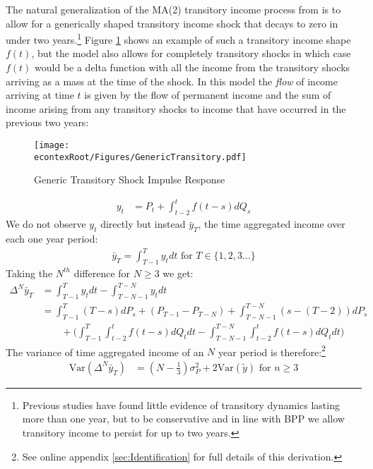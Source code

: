 \documentclass[titlepage]{\econtex}\newcommand{\texname}{ConsumptionHeterogeneity}
\begin{document}
The natural generalization of the MA(2) transitory income process from \cite{carroll_nature_1997} is to allow for a generically shaped transitory income shock that decays to zero in under two years.\footnote{Previous studies have found little evidence of transitory dynamics lasting more than one year, but to be conservative and in line with BPP we allow transitory income to persist for up to two years.} Figure \ref{fig:GenericTransitory} shows an example of such a transitory income shape $f(t)$, but the model also allows for completely transitory shocks in which case $f(t)$ would be a delta function with all the income from the transitory shocks arriving as a mass at the time of the shock. In this model the \textit{flow} of income arriving at time $t$ is given by the flow of permanent income and the sum of income arising from any transitory shocks to income that have occurred in the previous two years:
\begin{figure} 
	\begin{centering}
		\texttt{[image: \\econtexRoot/Figures/GenericTransitory.pdf]} 
		\caption{Generic Transitory Shock Impulse Response}
		\label{fig:GenericTransitory}
	\end{centering}
\end{figure}
\begin{align*}
y_t &= P_t + \int_{t-2}^{t} f(t-s)dQ_s
\end{align*}
We do not observe $y_t$ directly but instead $\bar{y}_T$, the time aggregated income over each one year period:
\begin{align}
\bar{y}_T = \int_{T-1}^{T} y_t dt \text{   for } T \in \{1,2,3...\}\label{income_TA}
\end{align}
Taking the $N^{th}$ difference for $N \geq 3$ we get:
\begingroup
\allowdisplaybreaks[0]
\begin{align}
\Delta^N \bar{y}_T &= \int_{T-1}^{T} y_t dt  - \int_{T-N-1}^{T-N} y_t dt  \nonumber \\ 
&= \int_{T-1}^{T} (T-s)dP_s  + (P_{T-1} - P_{T-N}) + \int_{T-N-1}^{T-N} (s-(T-2))dP_s \nonumber \\
& \qquad + \Big(\int_{T-1}^{T} \int_{t-2}^{t} f(t-s)dQ_t dt -\int_{T-N-1}^{T-N}\int_{t-2}^{t} f(t-s) dQ_t dt \Big) \label{deltaNy}
\end{align}
\endgroup
The variance of time aggregated income of an $N$ year period is therefore:\footnote{See online appendix \ref{sec:Identification} for full details of this derivation.}
\begin{align}
\mathrm{Var}(\Delta^N \bar{y}_T) &= (N-\frac{1}{3})\sigma^2_P +  2 \mathrm{Var}(\tilde{y}) \text{   for }n \geq 3 \label{variance}
\end{align}
\end{document}

